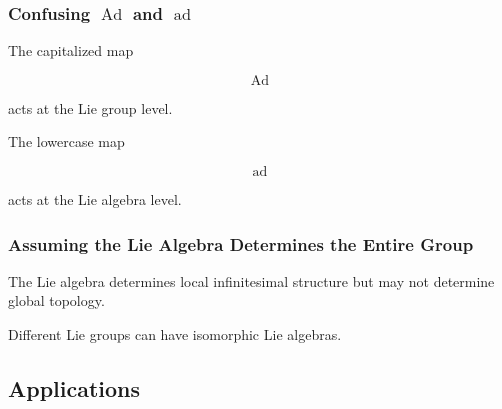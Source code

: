 \subsubsection{Confusing \(\operatorname{Ad}\) and \(\operatorname{ad}\)}

The capitalized map

\[ \operatorname{Ad} \]

acts at the Lie group level.

The lowercase map

\[ \operatorname{ad} \]

acts at the Lie algebra level.

\subsubsection{Assuming the Lie Algebra Determines the Entire Group}

The Lie algebra determines local infinitesimal structure but may not
determine global topology.

Different Lie groups can have isomorphic Lie algebras.

\subsection{Applications}
\label{subsec:lie-theory-applications}

